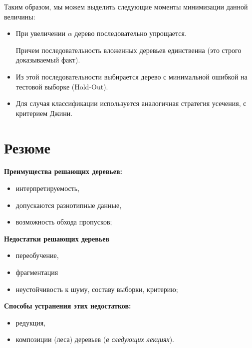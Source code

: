 \documentclass{article}
\begin{document}
Таким образом, мы можем выделить следующие моменты минимизации данной величины:

\begin{itemize}
\item При увеличении $\alpha$ дерево последовательно упрощается.

Причем последовательность вложенных деревьев единственна (это строго доказываемый факт).

\item Из этой последовательности выбирается дерево с минимальной ошибкой на тестовой выборке (Hold-Out).

\item Для случая классификации используется аналогичная стратегия усечения, с критерием Джини.
\end{itemize}

\newpage
\section{Резюме}

\textbf{Преимущества решающих деревьев:}

\begin{itemize}
\item интерпретируемость,
\item допускаются разнотипные данные,
\item возможность обхода пропусков;
\end{itemize}

\textbf{Недостатки решающих деревьев}

\begin{itemize}
\item переобучение,
\item фрагментация
\item неустойчивость к шуму, составу выборки, критерию;
\end{itemize}

\textbf{Способы устранения этих недостатков:}

\begin{itemize}
\item редукция,
\item композиции (леса) деревьев (\textit{в следующих лекциях}).
\end{itemize}
\end{document}
